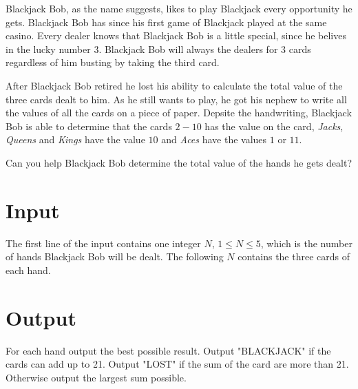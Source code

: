 Blackjack Bob, as the name suggests, likes to play Blackjack every opportunity he gets.
Blackjack Bob has since his first game of Blackjack played at the same casino. 
Every dealer knows that Blackjack Bob is a little special, since he belives in the lucky number $3$.
Blackjack Bob will always the dealers for 3 cards regardless of him busting by taking the third card.

After Blackjack Bob retired he lost his ability to calculate the total value of the three cards dealt to him.
As he still wants to play, he got his nephew to write all the values of all the cards on a piece of paper.
Depsite the handwriting, Blackjack Bob is able to determine that the cards $2-10$ has the value on the card, 
\textit{Jacks}, \textit{Queens} and \textit{Kings} have the value $10$ and \textit{Aces} have the values $1$ or $11$.

Can you help Blackjack Bob determine the total value of the hands he gets dealt?

\section*{Input}

The first line of the input contains one integer $N$, $1 \leq N \leq 5$, which is the number of hands 
Blackjack Bob will be dealt. The following $N$ contains the three cards of each hand.


\section*{Output}

For each hand output the best possible result.
Output "BLACKJACK" if the cards can add up to 21.
Output "LOST" if the sum of the card are more than 21.
Otherwise output the largest sum possible.

